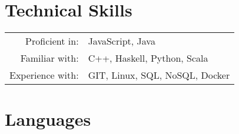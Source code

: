 \documentclass[a4paper,10pt]{article} %
\begin{document}
\vspace{5mm}







\section{Technical Skills}

\begin{tabular}{rl}
    Proficient in:   &  JavaScript, Java \\
    Familiar with:   &  C++, Haskell, Python, Scala \\
    Experience with: &  GIT, Linux, SQL, NoSQL, Docker \\
\end{tabular}

\vspace{5mm}

\section{Languages}
\end{document}
